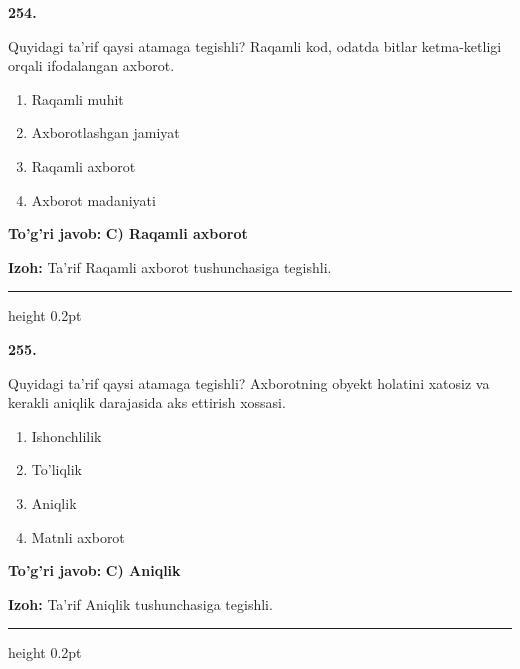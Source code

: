 \documentclass[10pt,a4paper,oneside]{article}
\begin{document}
\noindent\textbf{\color{ink}254.}
\par
Quyidagi ta'rif qaysi atamaga tegishli? Raqamli kod, odatda bitlar ketma-ketligi orqali ifodalangan axborot.
\begin{enumerate}[label=\Alph*),leftmargin=9mm]
\item Raqamli muhit
\item Axborotlashgan jamiyat
\item Raqamli axborot
\item Axborot madaniyati
\end{enumerate}
\begin{tcolorbox}[enhanced,breakable,colback=teal!4,colframe=teal!50!black,boxrule=0.5pt,arc=1.1mm,left=3mm,right=3mm,top=1.7mm,bottom=1.7mm,before skip=2mm,after skip=2mm]
\textbf{\color{teal}To'g'ri javob:} \textbf{C) Raqamli axborot}
\par\smallskip
\textbf{Izoh:} Ta'rif Raqamli axborot tushunchasiga tegishli.
\end{tcolorbox}
\vspace{2mm}\hrule height 0.2pt \vspace{3mm}

\noindent\textbf{\color{ink}255.}
\par
Quyidagi ta'rif qaysi atamaga tegishli? Axborotning obyekt holatini xatosiz va kerakli aniqlik darajasida aks ettirish xossasi.
\begin{enumerate}[label=\Alph*),leftmargin=9mm]
\item Ishonchlilik
\item To'liqlik
\item Aniqlik
\item Matnli axborot
\end{enumerate}
\begin{tcolorbox}[enhanced,breakable,colback=teal!4,colframe=teal!50!black,boxrule=0.5pt,arc=1.1mm,left=3mm,right=3mm,top=1.7mm,bottom=1.7mm,before skip=2mm,after skip=2mm]
\textbf{\color{teal}To'g'ri javob:} \textbf{C) Aniqlik}
\par\smallskip
\textbf{Izoh:} Ta'rif Aniqlik tushunchasiga tegishli.
\end{tcolorbox}
\vspace{2mm}\hrule height 0.2pt \vspace{3mm}
\end{document}
